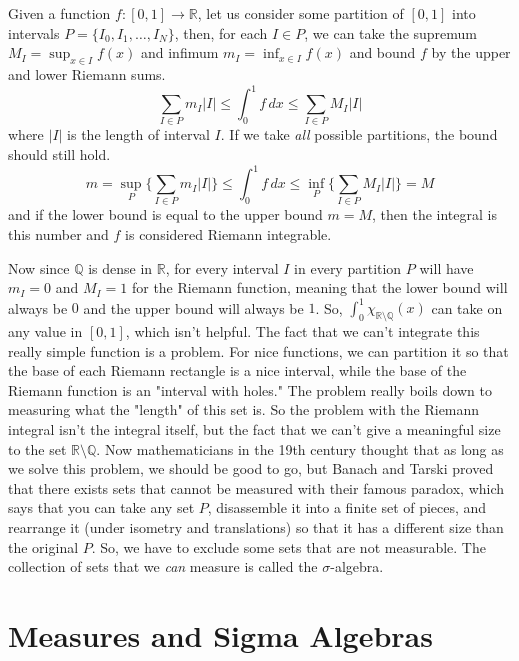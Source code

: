 \documentclass{article}
\begin{document}
\begin{definition}
Given a function $f: [0, 1] \longrightarrow \mathbb{R}$, let us consider some partition of $[0, 1]$ into intervals $P = \{I_0, I_1, \ldots, I_N\}$, then, for each $I \in P$, we can take the supremum $M_I = \sup_{x \in I} f(x)$ and infimum $m_I = \inf_{x \in I} f(x)$ and bound $f$ by the upper and lower Riemann sums. 
\[\sum_{I \in P} m_I |I| \leq \int_0^1 f \,dx \leq \sum_{I \in P} M_I |I| \]
where $|I|$ is the length of interval $I$. If we take \textit{all} possible partitions, the bound should still hold. 
\[m = \sup_P \Big\{ \sum_{I \in P} m_I |I| \Big\} \leq \int_0^1 f \,dx \leq \inf_P \Big\{ \sum_{I \in P} M_I |I| \Big\} = M\]
and if the lower bound is equal to the upper bound $m = M$, then the integral is this number and $f$ is considered Riemann integrable. 
\end{definition}

Now since $\mathbb{Q}$ is dense in $\mathbb{R}$, for every interval $I$ in every partition $P$ will have $m_I = 0$ and $M_I = 1$ for the Riemann function, meaning that the lower bound will always be $0$ and the upper bound will always be $1$. So, $\int_0^1 \chi_{\mathbb{R} \setminus \mathbb{Q}} (x)$ can take on any value in $[0, 1]$, which isn't helpful. The fact that we can't integrate this really simple function is a problem. For nice functions, we can partition it so that the base of each Riemann rectangle is a nice interval, while the base of the Riemann function is an "interval with holes." The problem really boils down to measuring what the "length" of this set is. So the problem with the Riemann integral isn't the integral itself, but the fact that we can't give a meaningful size to the set $\mathbb{R} \setminus \mathbb{Q}$. Now mathematicians in the 19th century thought that as long as we solve this problem, we should be good to go, but Banach and Tarski proved that there exists sets that cannot be measured with their famous paradox, which says that you can take any set $P$, disassemble it into a finite set of pieces, and rearrange it (under isometry and translations) so that it has a different size than the original $P$. So, we have to exclude some sets that are not measurable. The collection of sets that we \textit{can} measure is called the $\sigma$-algebra. 

\section{Measures and Sigma Algebras}
\end{document}
